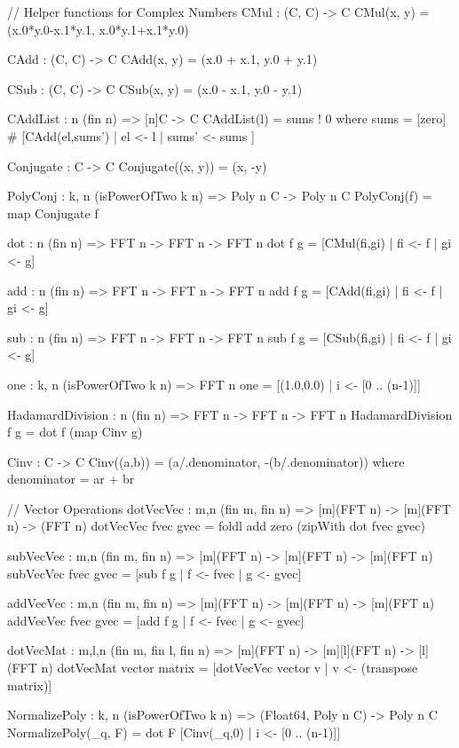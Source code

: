 \begin{code}
  // Helper functions for Complex Numbers 
  CMul : (C, C) -> C
  CMul(x, y) = (x.0*y.0-x.1*y.1, x.0*y.1+x.1*y.0)
  
  CAdd : (C, C) -> C 
  CAdd(x, y) = (x.0 + x.1, y.0 + y.1)
  
  CSub : (C, C) -> C 
  CSub(x, y) = (x.0 - x.1, y.0 - y.1)

  CAddList : {n} (fin n) => [n]C -> C 
  CAddList(l) = sums ! 0
    where sums = [zero] # [CAdd(el,sums') | el <- l 
                                          | sums' <- sums
                          ]

  Conjugate : C -> C 
  Conjugate((x, y)) = (x, -y)

  PolyConj : {k, n} (isPowerOfTwo k n) => Poly n C -> Poly n C
  PolyConj(f) = map Conjugate f

  dot : {n} (fin n) => FFT n -> FFT n -> FFT n
  dot f g = [CMul(fi,gi) | fi <- f | gi <- g]

  add : {n} (fin n) => FFT n -> FFT n -> FFT n
  add f g = [CAdd(fi,gi) | fi <- f | gi <- g]

  sub : {n} (fin n) => FFT n -> FFT n -> FFT n
  sub f g = [CSub(fi,gi) | fi <- f | gi <- g]

  one : {k, n} (isPowerOfTwo k n) => FFT n
  one = [(1.0,0.0) | i <- [0 .. (n-1)]]

  HadamardDivision : {n} (fin n) => FFT n -> FFT n -> FFT n
  HadamardDivision f g = dot f (map Cinv g)

  Cinv : C -> C
  Cinv((a,b)) = (a/.denominator, -(b/.denominator)) where 
    denominator = a^^2 + b^^2
\end{code}
\begin{code}
  // Vector Operations
  dotVecVec : {m,n} (fin m, fin n) => [m](FFT n) -> [m](FFT n) -> (FFT n)
  dotVecVec fvec gvec = foldl add zero (zipWith dot fvec gvec)

  subVecVec : {m,n} (fin m, fin n) => [m](FFT n) -> [m](FFT n) -> [m](FFT n)
  subVecVec fvec gvec = [sub f g | f <- fvec | g <- gvec]

  addVecVec : {m,n} (fin m, fin n) => [m](FFT n) -> [m](FFT n) -> [m](FFT n)
  addVecVec fvec gvec = [add f g | f <- fvec | g <- gvec]

  dotVecMat : {m,l,n} (fin m, fin l, fin n) =>
    [m](FFT n) -> [m][l](FFT n) -> [l](FFT n)
  dotVecMat vector matrix = [dotVecVec vector v | v <- (transpose matrix)]

  NormalizePoly : {k, n} (isPowerOfTwo k n) =>
    (Float64, Poly n C) -> Poly n C
  NormalizePoly(_q, F) = dot F [Cinv(_q,0) | i <- [0 .. (n-1)]]
\end{code}

